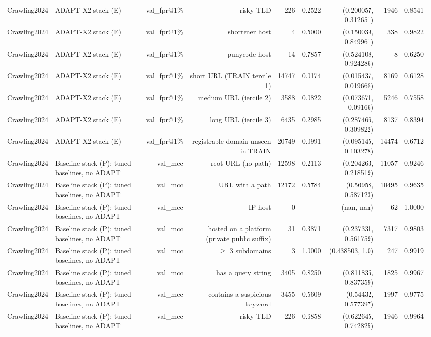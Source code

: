 \begin{table}[t]
\begin{tabular}{llrrrrrrr}
Crawling2024 & ADAPT-X2 stack (E) & val\_fpr@1\% & risky TLD & 226 & 0.2522 & (0.200057, 0.312651) & 1946 & 0.8541 \\
Crawling2024 & ADAPT-X2 stack (E) & val\_fpr@1\% & shortener host & 4 & 0.5000 & (0.150039, 0.849961) & 338 & 0.9822 \\
Crawling2024 & ADAPT-X2 stack (E) & val\_fpr@1\% & punycode host & 14 & 0.7857 & (0.524108, 0.924286) & 8 & 0.6250 \\
Crawling2024 & ADAPT-X2 stack (E) & val\_fpr@1\% & short URL (TRAIN tercile 1) & 14747 & 0.0174 & (0.015437, 0.019668) & 8169 & 0.6128 \\
Crawling2024 & ADAPT-X2 stack (E) & val\_fpr@1\% & medium URL (tercile 2) & 3588 & 0.0822 & (0.073671, 0.09166) & 5246 & 0.7558 \\
Crawling2024 & ADAPT-X2 stack (E) & val\_fpr@1\% & long URL (tercile 3) & 6435 & 0.2985 & (0.287466, 0.309822) & 8137 & 0.8394 \\
Crawling2024 & ADAPT-X2 stack (E) & val\_fpr@1\% & registrable domain unseen in TRAIN & 20749 & 0.0991 & (0.095145, 0.103278) & 14474 & 0.6712 \\
Crawling2024 & Baseline stack (P): tuned baselines, no ADAPT & val\_mcc & root URL (no path) & 12598 & 0.2113 & (0.204263, 0.218519) & 11057 & 0.9246 \\
Crawling2024 & Baseline stack (P): tuned baselines, no ADAPT & val\_mcc & URL with a path & 12172 & 0.5784 & (0.56958, 0.587123) & 10495 & 0.9635 \\
Crawling2024 & Baseline stack (P): tuned baselines, no ADAPT & val\_mcc & IP host & 0 & -- & (nan, nan) & 62 & 1.0000 \\
Crawling2024 & Baseline stack (P): tuned baselines, no ADAPT & val\_mcc & hosted on a platform (private public suffix) & 31 & 0.3871 & (0.237331, 0.561759) & 7317 & 0.9803 \\
Crawling2024 & Baseline stack (P): tuned baselines, no ADAPT & val\_mcc & $\geq$ 3 subdomains & 3 & 1.0000 & (0.438503, 1.0) & 247 & 0.9919 \\
Crawling2024 & Baseline stack (P): tuned baselines, no ADAPT & val\_mcc & has a query string & 3405 & 0.8250 & (0.811835, 0.837359) & 1825 & 0.9967 \\
Crawling2024 & Baseline stack (P): tuned baselines, no ADAPT & val\_mcc & contains a suspicious keyword & 3455 & 0.5609 & (0.54432, 0.577397) & 1997 & 0.9775 \\
Crawling2024 & Baseline stack (P): tuned baselines, no ADAPT & val\_mcc & risky TLD & 226 & 0.6858 & (0.622645, 0.742825) & 1946 & 0.9964 \\

\end{tabular}
\end{table}
